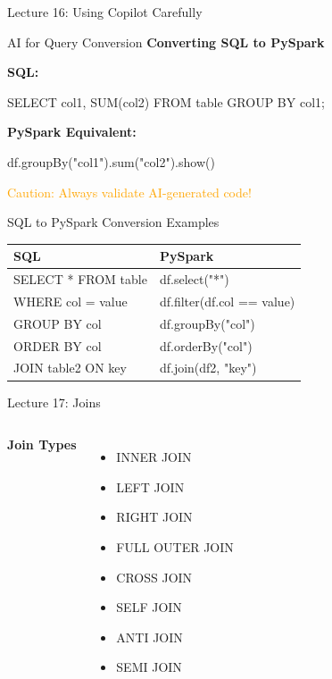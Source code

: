 \documentclass{beamer}
\begin{document}
	\begin{frame}{Lecture 16: Using Copilot Carefully}
		\begin{alertblock}{AI for Query Conversion}
			\textbf{Converting SQL to PySpark}
		\end{alertblock}
		
		\textbf{SQL:}
		\begin{center}
			\color{blue}
			SELECT col1, SUM(col2) FROM table GROUP BY col1;
			\color{black}
		\end{center}
		
		\textbf{PySpark Equivalent:}
		\begin{center}
			\color{blue}
			df.groupBy("col1").sum("col2").show()
			\color{black}
		\end{center}
		
		\begin{center}
			\textcolor{orange}{Caution: Always validate AI-generated code!}
		\end{center}
	\end{frame}
	
	\begin{frame}{SQL to PySpark Conversion Examples}
		\begin{table}
			\small
			\begin{tabular}{|p{0.45\textwidth}|p{}|}
				\hline
				\textbf{SQL} & \textbf{PySpark} \\
				\hline
				SELECT * FROM table & df.select("*") \\
				\hline
				WHERE col = value & df.filter(df.col == value) \\
				\hline
				GROUP BY col & df.groupBy("col") \\
				\hline
				ORDER BY col & df.orderBy("col") \\
				\hline
				JOIN table2 ON key & df.join(df2, "key") \\
				\hline
			\end{tabular}
		\end{table}
	\end{frame}
	
	\begin{frame}{Lecture 17: Joins}
		\begin{columns}[T]
			\textbf{Join Types}
			\begin{itemize}
				\small
				\item INNER JOIN
				\item LEFT JOIN
				\item RIGHT JOIN
				\item FULL OUTER JOIN
				\item CROSS JOIN
				\item SELF JOIN
				\item ANTI JOIN
				\item SEMI JOIN
			\end{itemize}
			
		\end{columns}
	\end{frame}
	
\end{document}
